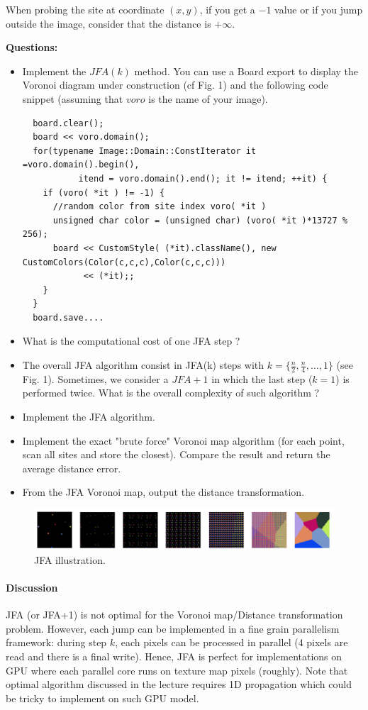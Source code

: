 \documentclass[a4paper, 11pt]{article}
\begin{document}
\noindent When probing the site at coordinate $(x,y)$, if you get a $-1$ value or if you jump outside the image, consider that the distance is $+\infty$.

\bigskip
{\bf Questions:}
\begin{itemize}
	\item Implement the $JFA(k)$ method. You can use a Board export to display the Voronoi diagram under construction (cf Fig. 1) and the following code snippet (assuming that $voro$ is the name of your image).
\begin{verbatim}
  board.clear();
  board << voro.domain();
  for(typename Image::Domain::ConstIterator it =voro.domain().begin(),
           itend = voro.domain().end(); it != itend; ++it) {
    if (voro( *it ) != -1) {
      //random color from site index voro( *it )
      unsigned char color = (unsigned char) (voro( *it )*13727 % 256);
      board << CustomStyle( (*it).className(), new CustomColors(Color(c,c,c),Color(c,c,c)))
            << (*it);;
    }
  }
  board.save....
\end{verbatim}
	\item What is the computational cost of one JFA step ?
	\item The overall JFA algorithm consist in JFA(k) steps with $k=\{\frac{n}{2}, \frac{n}{4}, \ldots, 1\}$ (see Fig. 1). Sometimes, we consider a $JFA+1$ in which the last step ($k=1$) is performed twice. What is the overall complexity of such algorithm ?
	\item Implement the JFA algorithm.
	\item Implement the exact "brute force" Voronoi map algorithm (for each point, scan all sites and store the closest). Compare the result and return the average distance error.
	\item From the JFA Voronoi map, output the distance transformation.
\end{itemize}

\begin{figure}
  \centering  \includegraphics[width=15cm]{jfa}
  \caption{JFA illustration.}
\end{figure}


\paragraph{Discussion}
\par JFA (or JFA+1) is not optimal for the Voronoi map/Distance transformation problem. However, each jump can be implemented in a fine grain parallelism framework: during step $k$, each pixels can be processed in parallel (4 pixels are read and there is a final write). Hence, JFA is perfect for implementations on GPU where each
parallel core runs on texture map pixels (roughly). Note that optimal algorithm discussed in the lecture requires 1D propagation which could be tricky to implement on such GPU model.
\end{document}
